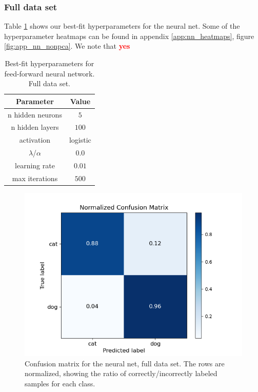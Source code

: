 \documentclass[a4paper]{article}
\newcommand\red[1]{\textcolor{red}{\textbf{#1}}}
\begin{document}
\subsubsection{Full data set}
Table \ref{tab:best_fit_nn_nonpca} shows our best-fit hyperparameters for the neural net. Some of the hyperparameter heatmaps can be found in appendix \ref{app:nn_heatmaps}, figure \ref{fig:app_nn_nonpca}. We note that \red{yes}
\begin{table}[H]
  \centering
  \caption{Best-fit hyperparameters for feed-forward neural network. Full data set.}
  \label{tab:best_fit_nn_nonpca}
  \begin{tabular}{c|c}
    \hline\hline
    Parameter & Value\\\hline
    n hidden neurons &  $5$\\
    n hidden layers &  $100$\\
    activation & logistic \\
    $\lambda$/$\alpha$  & $0.0$\\
    learning rate & $0.01$ \\
    max iterations & $500$
    \end{tabular}
\end{table}

\begin{figure}[H]
	\centering
	\includegraphics[scale=0.6]{../figures/neural_net/confusion_matrix_nbins200_pca0_seed4155_ts0.20.png}
	\caption{Confusion matrix for the neural net, full data set. The rows are normalized, showing the ratio of correctly/incorrectly labeled samples for each class.}
	\label{fig:nn_confusion_nonpca}
\end{figure}	
\end{document}

